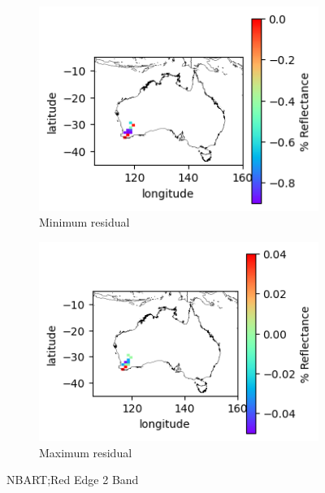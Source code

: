 \documentclass[a4paper]{article}
\begin{document}
      \begin{figure}[h!]
        \centering
          \begin{subfigure}[l]{.4\linewidth}
            \hspace{-32mm}
            \includegraphics[scale=0.9]{plots/nbart/nbart_red_edge_2-MinResidual.png}
            \caption{Minimum residual}
          \end{subfigure}
%
          \begin{subfigure}[r]{.4\linewidth}
            \includegraphics[scale=0.9]{plots/nbart/nbart_red_edge_2-MaxResidual.png}
            \caption{Maximum residual}
          \end{subfigure}
        \caption{NBART;\@ Red Edge 2 Band}\label{figure:11}
      \end{figure}
\end{document}
